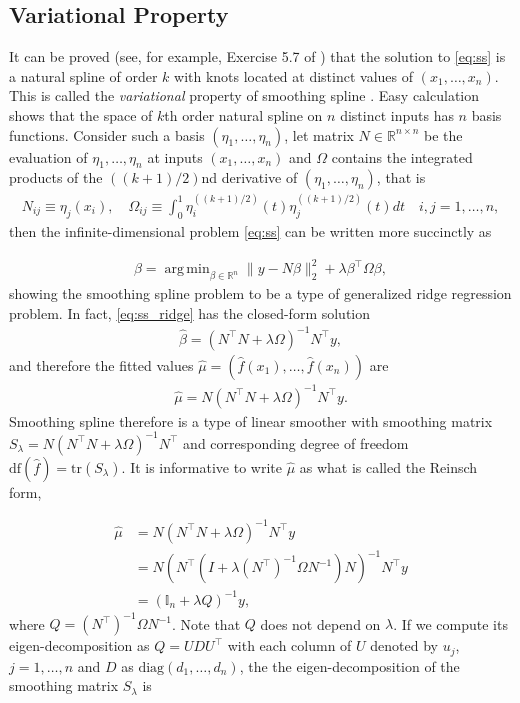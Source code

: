 \documentclass[a4paper]{article}
\DeclareMathOperator*{\argmin}{arg\,min}
\newcommand{\RR}{\mathbb{R}}
\begin{document}
\subsection{Variational Property}
\label{subsec:var_property}
It can be proved (see, for example, Exercise 5.7 of \cite{friedman2001elements}) that the solution to \eqref{eq:ss} is a natural spline of order $k$ with knots located at distinct values of $(x_1,\ldots, x_n)$. This is called the \textit{variational} property of smoothing spline \cite{anselone1968general}. Easy calculation shows that the space of $k$th order natural spline on $n$ distinct inputs has $n$ basis functions. Consider such a basis $(\eta_1,\ldots, \eta_n)$, let matrix $N\in\RR^{n\times n}$ be the evaluation of $\eta_1,\ldots, \eta_n$ at inputs $(x_1,\ldots, x_n)$ and $\Omega$ contains the integrated products of the $((k+1)/2)$nd derivative of $(\eta_1,\ldots, \eta_n)$, that is
\begin{align*}
N_{ij} \equiv \eta_j(x_i), \quad \Omega_{ij} \equiv \int_0^1 \eta_i^{((k+1)/2)}(t)\eta_j^{((k+1)/2)}(t)dt \quad i,j=1,\ldots,n,
\end{align*}
then the infinite-dimensional problem \eqref{eq:ss} can be written more succinctly as

\begin{align}
\hat{\beta} = \argmin_{\beta\in\RR^n} \|y-N\beta\|_2^2 + \lambda\beta^\top\Omega\beta,
\label{eq:ss_ridge}
\end{align}
showing the smoothing spline problem to be a type of generalized ridge regression problem. In fact, \eqref{eq:ss_ridge} has the closed-form solution
\begin{align*}
\hat{\beta} = (N^\top N + \lambda\Omega)^{-1}N^\top y,
\end{align*}
and therefore the fitted values $\hat{\mu} = (\hat{f}(x_1),\ldots, \hat{f}(x_n))$ are
\begin{align*}
\hat{\mu} = N(N^\top N + \lambda\Omega)^{-1}N^\top y.
\end{align*}
Smoothing spline therefore is a type of linear smoother with smoothing matrix $S_\lambda = N(N^\top N + \lambda\Omega)^{-1}N^\top$ and corresponding degree of freedom $\mbox{df}(\hat{f}) = \mbox{tr}(S_\lambda)$. It is informative to write $\hat{\mu}$ as what is called the Reinsch form,

\begin{equation*}
\begin{aligned}
\hat{\mu} &= N(N^\top N + \lambda\Omega)^{-1}N^\top y\\
&= N(N^\top(I + \lambda (N^\top)^{-1}\Omega N^{-1})N)^{-1}N^\top y\\
&= (\mathbb{I}_n + \lambda Q)^{-1}y,
\end{aligned}
\end{equation*}
where $Q =(N^\top)^{-1}\Omega N^{-1}$. Note that $Q$ does not depend on $\lambda$. If we compute its eigen-decomposition as $Q = UDU^\top$ with each column of $U$ denoted by $u_j$, $j=1,\ldots, n$ and $D$ as $\mbox{diag}(d_1,\ldots, d_n)$, the the eigen-decomposition of the smoothing matrix $S_\lambda$ is 
\end{document}
